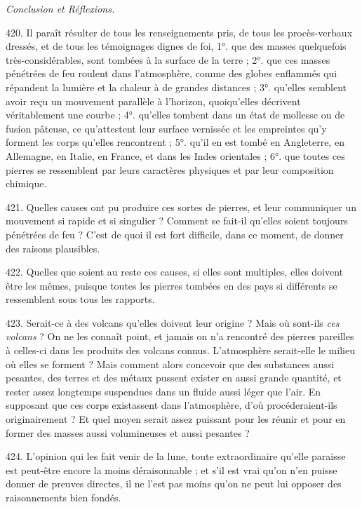 \documentclass[a4paper, 11pt, oneside, polutonikogreek, french]{article}
\begin{document}
\begin{center}
\emph{Conclusion et Réflexions.}
\end{center}

420. Il paraît résulter de tous les renseignements pris, de tous les procès-verbaux dressés, et de tous les témoignages dignes de foi, 1°. que des masses quelquefois très-considérables, sont tombées à la surface de la terre ; 2°. que ces masses pénétrées de feu roulent dans l'atmosphère, comme des globes enflammés qui répandent la lumière et la chaleur à de grandes distances ; 3°. qu'elles semblent avoir reçu un mouvement parallèle à l'horizon, quoiqu'elles décrivent véritablement une courbe ; 4°. qu'elles tombent dans un état de mollesse ou de fusion pâteuse, ce qu'attestent leur surface vernissée et les empreintes qu'y forment les corps qu'elles rencontrent ; 5°. qu'il en est tombé en Angleterre, en Allemagne, en Italie, en France, et dans les Indes orientales ; 6°. que toutes ces pierres se ressemblent par leurs caractères physiques et par leur composition chimique.

421. Quelles causes ont pu produire ces sortes de pierres, et leur communiquer un mouvement si rapide et si singulier ? Comment se fait-il qu'elles soient toujours pénétrées de feu ? C'est de quoi il est fort difficile, dans ce moment, de donner des raisons plausibles.

422. Quelles que soient au reste ces causes, si elles sont multiples, elles doivent être les mêmes, puisque toutes les pierres tombées en des pays si différents se ressemblent sous tous les rapports.

423. Serait-ce à des volcans qu'elles doivent leur origine ? Mais où sont-ils \emph{ces volcans} ? On ne les connaît point, et jamais on n'a rencontré des pierres pareilles à celles-ci dans les produits des volcans connus. L'atmosphère serait-elle le milieu où elles se forment ? Mais comment alors concevoir que des substances aussi pesantes, des terres et des métaux pussent exister en aussi grande quantité, et rester assez longtemps suspendues dans un fluide aussi léger que l'air. En supposant que ces corps existassent dans l'atmosphère, d'où procéderaient-ils originairement ? Et quel moyen serait assez puissant pour les réunir et pour en former des masses aussi volumineuses et aussi pesantes ?

424. L'opinion qui les fait venir de la lune, toute extraordinaire qu'elle paraisse est peut-être encore la moins déraisonnable ; et s'il est vrai qu'on n'en puisse donner de preuves directes, il ne l'est pas moins qu'on ne peut lui opposer des raisonnements bien fondés.
\end{document}
